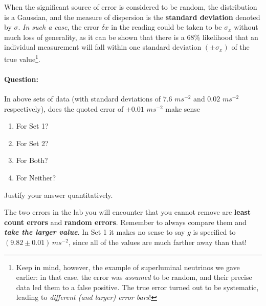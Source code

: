 When the significant source of error is considered to be random, the distribution is a Gaussian, and the measure of dispersion is the \textbf{standard deviation} denoted by $\sigma$. \textit{In such a case}, the error $\delta x$ in the reading could be taken to be $\sigma_x$ without much loss of generality, as it can be shown that there is a 68\% likelihood that an individual measurement will fall within one standard deviation $(\pm\sigma_x)$ of the true value\footnote{Keep in mind, however, the example of superluminal neutrinos we gave earlier: in that case, the error was \textit{assumed} to be random, and their precise data led them to a false positive. The true error turned out to be systematic, leading to \textit{different (and larger) error bars}!}. 

\begin{question}
\paragraph{Question:} In above sets of data (with standard deviations of $7.6\,\,ms^{-2}$ and $0.02\,\,ms^{-2}$ respectively), does the quoted error of $\pm 0.01\,\, ms^{-2}$ make sense
\begin{enumerate}
    \item For Set 1?
    \item For Set 2?
    \item For Both?
    \item For Neither?
\end{enumerate}
Justify your answer quantitatively.
\end{question}

\begin{imp}
The two errors in the lab you will encounter that you cannot remove are \textbf{least count errors} and \textbf{random errors}. Remember to always compare them and \textbf{\textit{take the larger value}}. In Set 1 it makes no sense to say $g$ is specified to $(9.82\pm0.01)\,ms^{-2}$, since all of the values are much farther away than that!
\end{imp}

